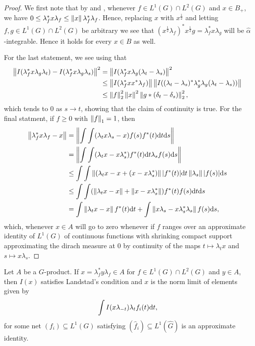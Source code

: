 \begin{proof}
	We first note that by  and , whenever $f\in L^1(G) \cap L^2(G)$ and $ x \in B_+$, we have $0 \leq \lambda_f^* x \lambda_f \leq \left\lVert x \right\rVert \lambda_f^* \lambda_f$. Hence, replacing $x$ with $x^{\frac12}$ and letting $f,g \in L^1(G) \cap L^2(G)$ be arbitrary we see that $( x^{\frac12}\lambda_f)^* x^{\frac12} g  = \lambda_f^* x \lambda_g$ will be $\hat \alpha$-integrable. Hence it holds for every $x \in B$ as well.

	For the last statement, we see using  that
	\begin{align*}
		\left\lVert I(\lambda_f^* x \lambda_g \lambda_t) - I(\lambda_f^* x \lambda_g \lambda_s)\right\rVert^2 &= \left\lVert I(\lambda_f^* x \lambda_g(\lambda_t-\lambda_s)\right\rVert^2 \\
		&\leq \left\lVert I(\lambda_f^* x x^* \lambda_f)\right\rVert  \left\lVert I( ( \lambda_t - \lambda_s)^* \lambda_g^* \lambda_g ( \lambda_t - \lambda_s))\right\rVert \\
		&\leq \left\lVert f \right\rVert _ 2^2 \left\lVert x \right\rVert ^2 \left\lVert g \ast(\delta_{t}-\delta_s) \right\rVert_2^2,
	\end{align*}
	which tends to $0$ as $s \to t$, showing that the claim of continuity is true. For the final statment, if $f \geq 0$ with $\left\lVert f \right\rVert_1 = 1$, then
	\begin{align*}
		\left\lVert \lambda_f^* x \lambda_f - x \right\rVert &= \left\lVert \int \int (\lambda_t x \lambda_s-x) f(s) f^*(t) \mathrm{d} t \mathrm{d} s \right\rVert \\
	&= \left\lVert \int \int (\lambda_t x  - x \lambda_s^*)f^*(t) \mathrm{d} t \lambda_s f(s) \mathrm{d} s \right\rVert\\
	&\leq \int \int \left\lVert ( \lambda_t x -x + (x-x\lambda_s^* )\right\rVert |f^*(t)| \mathrm{d} t \left\lVert\lambda_s \right\rVert |f(s)| \mathrm{d} s \\
	&\leq \int \int (\left\lVert \lambda_t x - x \right\rVert + \left\lVert  x -x\lambda_s^* \right\rVert)  f^*(t) f(s) \mathrm{d} t \mathrm{d} s\\
	&= \int \left\lVert \lambda_t x -x \right\rVert f^*(t) \mathrm{d} t + \int \left\lVert x \lambda_s - x \lambda_s^* \lambda_s \right\rVert f(s) \mathrm{d} s,
	\end{align*}
	which, whenever $x \in A$ will go to zero whenever if $f$ ranges over an approximate identity of $L^1(G)$ of continuous functions with shrinking compact support approximating the dirach measure at $0$ by continuity of the maps $t \mapsto \lambda_t x$ and $s \mapsto x \lambda_s$.
\end{proof}
\begin{proposition}
	Let $A$ be a $G$-product. If $x = \lambda_f^* y \lambda_f \in A$ for $f \in L^1(G) \cap L^2(G)$ and $y \in A$, then $I(x)$ satisfies Landstad's condition and $x$ is the norm limit of elements given by 
	\begin{align*}
		\int I(x \lambda_{-t}) \lambda_t f_i(t) \mathrm{d} t,
	\end{align*}
	for some net $(f_i) \subseteq L^1(G)$ satisfying $(\hat f_i) \subseteq L^1(\hat G)$ is an approximate identity.
	\label{olpe1lemma2.8}
\end{proposition}
